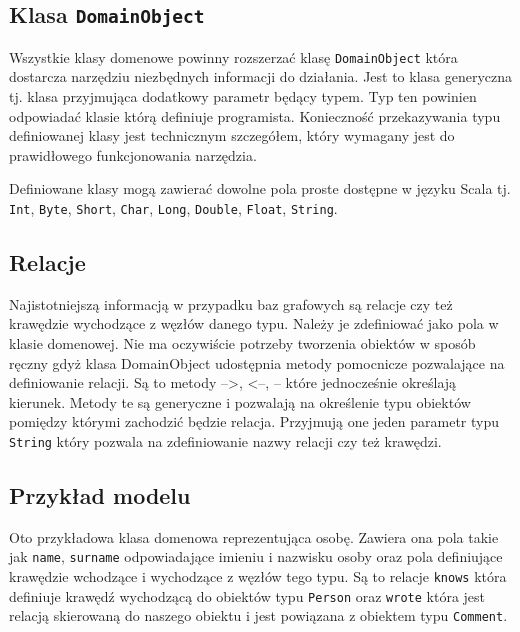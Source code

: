 \documentclass[brudnopis]{xmgr}
\begin{document}
\subsection{Klasa \texttt{DomainObject}}

Wszystkie klasy domenowe powinny rozszerzać klasę \texttt{DomainObject} która dostarcza narzędziu niezbędnych informacji do działania. Jest to klasa generyczna tj. klasa przyjmująca dodatkowy parametr będący typem. Typ ten powinien odpowiadać klasie którą definiuje programista. Konieczność przekazywania typu definiowanej klasy jest technicznym szczegółem, który wymagany jest do prawidłowego funkcjonowania narzędzia.

Definiowane klasy mogą zawierać dowolne pola proste dostępne w języku Scala tj. \texttt{Int}, \texttt{Byte}, \texttt{Short}, \texttt{Char}, \texttt{Long}, \texttt{Double}, \texttt{Float}, \texttt{String}.

\subsection{Relacje}

Najistotniejszą informacją w przypadku baz grafowych są relacje czy też krawędzie wychodzące z węzłów danego typu. Należy je zdefiniować jako pola w klasie domenowej. Nie ma oczywiście potrzeby tworzenia obiektów w sposób ręczny gdyż klasa DomainObject udostępnia metody pomocnicze pozwalające na definiowanie relacji. Są to metody  -->, <--, -- które jednocześnie określają kierunek. Metody te są generyczne i pozwalają na określenie typu obiektów pomiędzy którymi zachodzić będzie relacja. Przyjmują one jeden parametr typu \texttt{String} który pozwala na zdefiniowanie nazwy relacji czy też krawędzi.

\subsection{Przykład modelu}

Oto przykładowa klasa domenowa reprezentująca osobę. Zawiera ona pola takie jak \texttt{name}, \texttt{surname} odpowiadające imieniu i nazwisku osoby oraz pola definiujące krawędzie wchodzące i wychodzące z węzłów tego typu. Są to relacje \texttt{knows} która definiuje krawędź wychodzącą do obiektów typu \texttt{Person} oraz \texttt{wrote} która jest relacją skierowaną do naszego obiektu i jest powiązana z obiektem typu \texttt{Comment}.


\end{document}
